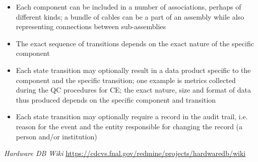 \documentclass[pdftex,12pt,letter]{article}
\begin{document}
\begin{itemize}

\item Each component can be included in a number of associations, perhaps of different kinds; a bundle of cables
can be a part of an assembly while also representing connections between sub-assemblies

\item The exact sequence of transitions depends on the exact nature of the specific  component

\item Each state transition may optionally result in a data product specific to the component and the specific transition;
one example is metrics collected during the QC procedures for CE; the exact nature, size and format of data thus produced
depends on the specific component and transition

\item Each state transition may optionally require a record in the audit trail, i.e.\,reason for the event and the entity
responsible for changing the record (a person and/or institution)

\end{itemize}


\clearpage

\begin{thebibliography}{1}

{\textit{Hardware DB Wiki} \url{https://cdcvs.fnal.gov/redmine/projects/hardwaredb/wiki}}

\end{thebibliography}
\end{document}
